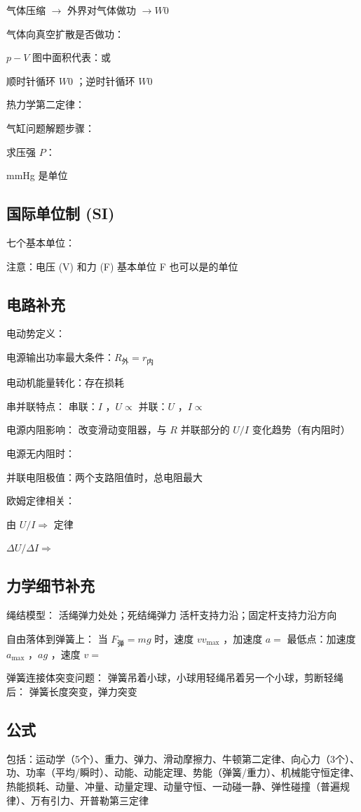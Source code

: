 气体压缩 $\rightarrow$ 外界对气体做功 $\rightarrow W $\sbl $0$

气体向真空扩散是否做功：

$p-V$ 图中面积代表：\sbl 或 \sbl

顺时针循环 $W $\sbl $0$ ；逆时针循环 $W $\sbl $0$

热力学第二定律：


气缸问题解题步骤：


求压强 $P$：


mmHg 是\sbl 单位

\subsection{国际单位制 (SI)}

七个基本单位：

注意：电压 (V) 和力 (F) \sbl 基本单位
F 也可以是\sbl 的单位

\subsection{电路补充}

电动势定义：

电源输出功率最大条件：$R_{\text{外}} =$\sbl $r_{\text{内}}$

电动机能量转化：存在损耗\lbl

串并联特点：
串联：$I$ \sbl ，$U \propto$ \sbl
并联：$U$ \sbl ，$I \propto$ \sbl

电源内阻影响：
改变滑动变阻器，与 $R$ 并联部分的 $U/I$ 变化趋势\sbl （有内阻时）

电源无内阻时：\xlbl

并联电阻极值：两个支路阻值\lbl 时，总电阻最大

欧姆定律相关：

由 $U/I \Rightarrow$ \sbl 定律

$\Delta U/\Delta I \Rightarrow$ \sbl


\subsection{力学细节补充}

绳结模型：
活绳弹力处处\sbl ；死结绳弹力\sbl
活杆支持力沿\sbl ；固定杆支持力沿\sbl 方向

自由落体到弹簧上：
当 $F_{\text{弹}} = mg$ 时，速度 $v $\sbl $v_{\max}$ ，加速度 $a =$\sbl
最低点：加速度 $a_{\max}$ ，$a $\sbl $g$ ，速度 $v =$\sbl

弹簧连接体突变问题：
弹簧吊着小球，小球用轻绳吊着另一个小球，剪断轻绳后：
弹簧长度\sbl 突变，弹力\sbl 突变

\subsection{公式}

包括：运动学（5个）、重力、弹力、滑动摩擦力、牛顿第二定律、向心力（3个）、功、功率（平均/瞬时）、动能、动能定理、势能（弹簧/重力）、机械能守恒定律、热能损耗、动量、冲量、动量定理、动量守恒、一动碰一静、弹性碰撞（普遍规律）、万有引力、开普勒第三定律

